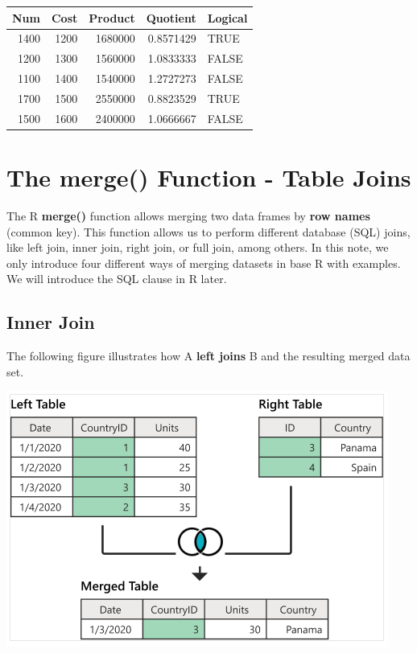 \documentclass[
]{book}
\begin{document}
\begin{tabular}{r|r|r|r|l}
\hline
Num & Cost & Product & Quotient & Logical\\
\hline
1400 & 1200 & 1680000 & 0.8571429 & TRUE\\
\hline
1200 & 1300 & 1560000 & 1.0833333 & FALSE\\
\hline
1100 & 1400 & 1540000 & 1.2727273 & FALSE\\
\hline
1700 & 1500 & 2550000 & 0.8823529 & TRUE\\
\hline
1500 & 1600 & 2400000 & 1.0666667 & FALSE\\
\hline
\end{tabular}

\hypertarget{the-merge-function---table-joins}{%
\section{\texorpdfstring{The \textbf{merge()} Function - Table Joins}{The merge() Function - Table Joins}}\label{the-merge-function---table-joins}}

The R \textbf{merge()} function allows merging two data frames by \textbf{row names} (common key). This function allows us to perform different database (SQL) joins, like left join, inner join, right join, or full join, among others. In this note, we only introduce four different ways of merging datasets in base R with examples. We will introduce the SQL clause in R later.

\hfill\break

\hypertarget{inner-join}{%
\subsection{Inner Join}\label{inner-join}}

The following figure illustrates how A \textbf{left joins} B and the resulting merged data set.

\begin{center}\includegraphics[width=0.7\linewidth]{img05/w5-innerJoin} \end{center}
\end{document}
